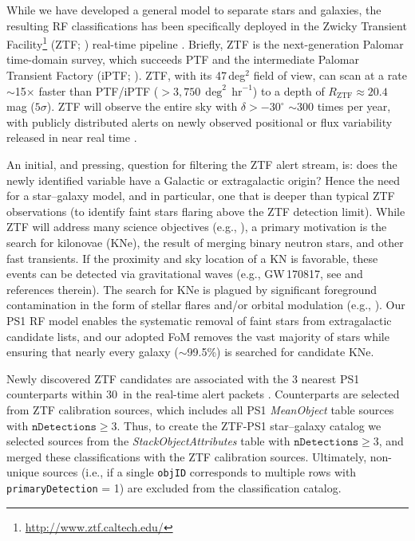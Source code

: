\documentclass[twocolumn]{aastex62}
\begin{document}
While we have developed a general model to separate stars and galaxies, the
resulting RF classifications has been specifically deployed in the Zwicky
Transient Facility\footnote{\url{http://www.ztf.caltech.edu/}} (ZTF;
\citealt{Bellm:18:ZTF, Dekany:18:ZTF}) real-time pipeline
\citep{Masci:18:ZTF}. Briefly, ZTF is the next-generation Palomar
time-domain survey, which succeeds PTF \citep{Rau09, Law09} and the
intermediate Palomar Transient Factory (iPTF; \citealt{Kulkarni13}). ZTF,
with its 47\,deg$^2$ field of view, can scan at a rate $\sim$15$\times$
faster than PTF/iPTF ($>3{,}750\,\deg^2\,\mathrm{hr}^{-1}$) to a depth of
$R_\mathrm{ZTF} \approx 20.4$\,mag ($5\sigma$). ZTF will observe the entire
sky with $\delta > -30^{\circ}$ $\sim$300 times per year, with publicly
distributed alerts on newly observed positional or flux variability released
in near real time \citep{Patterson:18:ZTF}.

An initial, and pressing, question for filtering the ZTF alert stream, is:
does the newly identified variable have a Galactic or extragalactic origin?
Hence the need for a star--galaxy model, and in particular, one that is
deeper than typical ZTF observations (to identify faint stars flaring above
the ZTF detection limit). While ZTF will address many science objectives
(e.g., \citealt{Graham:18:ZTF}), a primary motivation is the search for
kilonovae (KNe), the result of merging binary neutron stars, and other fast
transients. If the proximity and sky location of a KN is favorable, these
events can be detected via gravitational waves (e.g., GW\,170817, see
\citealt{Abbott17} and references therein). The search for KNe is plagued by
significant foreground contamination in the form of stellar flares and/or
orbital modulation (e.g., \citealt{Kulkarni06, Berger12, Kasliwal16}). Our
PS1 RF model enables the systematic removal of faint stars from
extragalactic candidate lists, and our adopted FoM removes the vast majority
of stars while ensuring that nearly every galaxy ($\sim$99.5\%) is searched
for candidate KNe.

Newly discovered ZTF candidates are associated with the 3 nearest PS1
counterparts within 30\arcsec\ in the real-time alert packets
\citep{Masci:18:ZTF}. Counterparts are selected from ZTF calibration
sources, which includes all PS1 \textit{MeanObject} table sources with
$\mathtt{nDetections} \ge 3$. Thus, to create the ZTF-PS1 star--galaxy
catalog we selected sources from the \textit{StackObjectAttributes} table
with $\mathtt{nDetections} \ge 3$, and merged these classifications with the
ZTF calibration sources. Ultimately, non-unique sources (i.e., if a single
\texttt{objID} corresponds to multiple rows with \texttt{primaryDetection} =
1) are excluded from the classification catalog.
\end{document}
